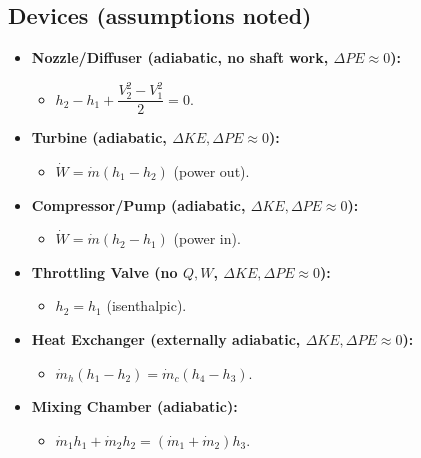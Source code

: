 \documentclass[10pt]{article}
\begin{document}
\begin{multicols}{2}
\subsection{Devices (assumptions noted)}
\begin{itemize}
    \item \textbf{Nozzle/Diffuser (adiabatic, no shaft work, $\Delta PE\approx 0$):}
    \begin{itemize}
        \item $h_2-h_1+\dfrac{V_2^2-V_1^2}{2}=0$.
    \end{itemize}
    \item \textbf{Turbine (adiabatic, $\Delta KE,\Delta PE\approx 0$):}
    \begin{itemize}
        \item $\dot W=\dot m(h_1-h_2)$ (power out).
    \end{itemize}
    \item \textbf{Compressor/Pump (adiabatic, $\Delta KE,\Delta PE\approx 0$):}
    \begin{itemize}
        \item $\dot W=\dot m(h_2-h_1)$ (power in).
    \end{itemize}
    \item \textbf{Throttling Valve (no $Q,W$, $\Delta KE,\Delta PE\approx 0$):}
    \begin{itemize}
        \item $h_2=h_1$ (isenthalpic).
    \end{itemize}
    \item \textbf{Heat Exchanger (externally adiabatic, $\Delta KE,\Delta PE\approx 0$):}
    \begin{itemize}
        \item $\dot m_h(h_1-h_2)=\dot m_c(h_4-h_3)$.
    \end{itemize}
    \item \textbf{Mixing Chamber (adiabatic):}
    \begin{itemize}
        \item $\dot m_1h_1+\dot m_2h_2=(\dot m_1+\dot m_2)h_3$.
    \end{itemize}
\end{itemize}


\end{multicols}
\end{document}
